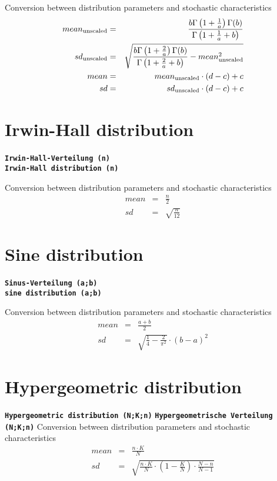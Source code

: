 \documentclass{svmono}
\def\cm#1{\textbf{\texttt{#1}}}
\begin{document}
Conversion between distribution parameters and stochastic characteristics
\begin{eqnarray*}
mean_{\rm unscaled}&=&\frac{b\Gamma\left(1+\frac{1}{a}\right)\Gamma(b)}{\Gamma\left(1+\frac{1}{a}+b\right)}\\
sd_{\rm unscaled}&=&\sqrt{\frac{b\Gamma\left(1+\frac{2}{a}\right)\Gamma(b)}{\Gamma\left(1+\frac{2}{a}+b\right)}-mean_{\rm unscaled}^2}\\
mean&=&mean_{\rm unscaled}\cdot(d-c)+c\\
sd&=&sd_{\rm unscaled}\cdot(d-c)+c\\
\end{eqnarray*}





\section*{Irwin-Hall distribution}
\cm{Irwin-Hall-Verteilung (n)}~\\
\cm{Irwin-Hall distribution (n)}

Conversion between distribution parameters and stochastic characteristics
\begin{eqnarray*}
mean&=&\frac{n}{2}\\
sd&=&\sqrt{\frac{n}{12}}
\end{eqnarray*}





\section*{Sine distribution}
\cm{Sinus-Verteilung (a;b)}~\\
\cm{sine distribution (a;b)}

Conversion between distribution parameters and stochastic characteristics
\begin{eqnarray*}
mean&=&\frac{a+b}{2}\\
sd&=&\sqrt{\frac{1}{4}-\frac{2}{\pi^2}}\cdot(b-a)^2
\end{eqnarray*}





\section*{Hypergeometric distribution}
\cm{Hypergeometric distribution (N;K;n)}
\cm{Hypergeometrische Verteilung (N;K;n)}
Conversion between distribution parameters and stochastic characteristics
\begin{eqnarray*}
mean&=&\frac{n\cdot K}{N}\\
sd&=&\sqrt{\frac{n\cdot K}{N}\cdot\left(1-\frac{K}{N}\right)\cdot\frac{N-n}{N-1}}
\end{eqnarray*}
\end{document}
